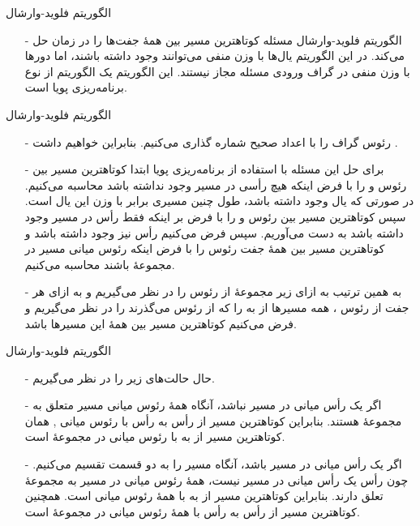 
\begin{frame}{‌الگوریتم فلوید-وارشال}
\begin{itemize}\itemr
\item[-]
الگوریتم فلوید-وارشال
مسئله کوتاهترین مسیر بین همهٔ جفت‌ها را در زمان
حل می‌کند. در این الگوریتم یال‌ها با وزن منفی می‌توانند وجود داشته باشند، اما دورها با وزن منفی در گراف ورودی مسئله مجاز نیستند.
این الگوریتم یک الگوریتم از نوع برنامه‌ریزی پویا است.
\end{itemize}
\end{frame}


\begin{frame}{‌الگوریتم فلوید-وارشال}
\begin{itemize}\itemr
\item[-]
رئوس گراف
را با اعداد صحیح شماره گذاری می‌کنیم. بنابراین خواهیم داشت
 .
\item[-]
برای حل این مسئله با استفاده از برنامه‌ریزی پویا ابتدا کوتاهترین مسیر بین رئوس 
و
را با فرض اینکه
هیچ رأسی در مسیر وجود نداشته باشد محاسبه می‌کنیم. در صورتی که یال
وجود داشته باشد، طول چنین مسیری برابر با وزن این یال است.
سپس کوتاهترین مسیر بین رئوس
و
را با فرض بر اینکه
 فقط رأس 
در مسیر
 وجود داشته باشد به دست می‌آوریم. سپس فرض می‌کنیم رأس 
  نیز وجود داشته باشد
و کوتاهترین مسیر بین همهٔ جفت رئوس را با فرض اینکه رئوس میانی مسیر
در مجموعهٔ
باشند محاسبه می‌کنیم.
\item[-]
 به همین ترتیب 
به ازای
زیر مجموعهٔ
از رئوس را در نظر می‌گیریم و به ازای هر جفت از رئوس
، همه مسیرها از
به
را که از رئوس
می‌گذرند را در نظر می‌گیریم و فرض می‌کنیم
کوتاهترین مسیر بین همهٔ این مسیرها باشد.
\end{itemize}
\end{frame}


\begin{frame}{‌الگوریتم فلوید-وارشال}
\begin{itemize}\itemr
\item[-]
حال حالت‌های زیر را در نظر می‌گیریم.
\item[-]
اگر
یک رأس میانی در مسیر
نباشد، آنگاه همهٔ رئوس میانی مسیر
متعلق به مجموعهٔ
هستند. بنابراین کوتاهترین مسیر از رأس
به رأس
با رئوس میانی
 ,
همان
کوتاهترین مسیر از
به
با رئوس میانی در مجموعهٔ
است.
\item[-]
اگر
یک رأس میانی در مسیر
باشد، آنگاه مسیر
را به دو قسمت
تقسیم می‌کنیم. 
 چون رأس
یک رأس میانی در مسیر
نیست، همهٔ رئوس میانی در مسیر
به مجموعهٔ
تعلق دارند. بنابراین
کوتاهترین مسیر از
به
با همهٔ رئوس میانی
است. همچنین
کوتاهترین مسیر از رأس
به رأس
با همهٔ رئوس میانی در مجموعهٔ
است.
\end{itemize}
\end{frame}



